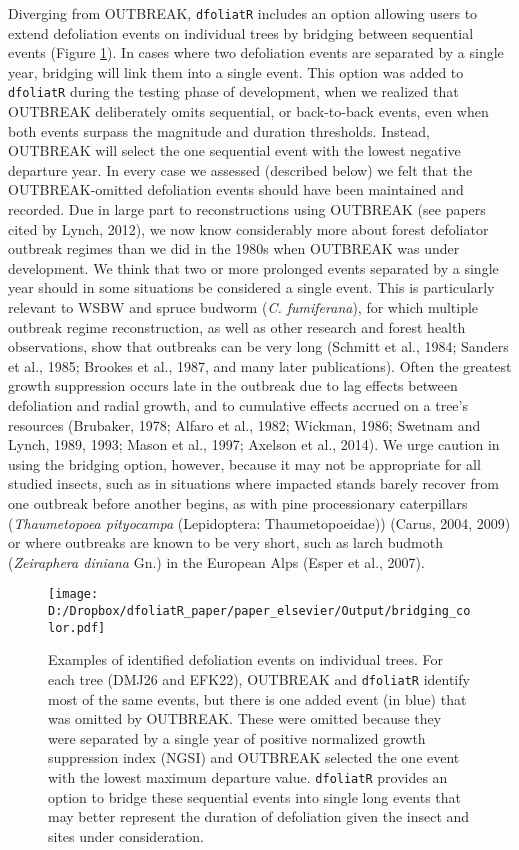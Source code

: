 \documentclass[review]{elsarticle} %
\makeatletter
\def\maxwidth{\ifdim\Gin@nat@width>\linewidth\linewidth
\else\Gin@nat@width\fi}
\let\Oldincludegraphics\includegraphics
\renewcommand{\includegraphics}[1]{\Oldincludegraphics[width=\maxwidth]{#1}}
\makeatother
\begin{document}
Diverging from OUTBREAK, \texttt{dfoliatR} includes an option allowing users to extend defoliation events on individual trees by bridging between sequential events (Figure \ref{fig:fig-bridge}). In cases where two defoliation events are separated by a single year, bridging will link them into a single event. This option was added to \texttt{dfoliatR} during the testing phase of development, when we realized that OUTBREAK deliberately omits sequential, or back-to-back events, even when both events surpass the magnitude and duration thresholds. Instead, OUTBREAK will select the one sequential event with the lowest negative departure year. In every case we assessed (described below) we felt that the OUTBREAK-omitted defoliation events should have been maintained and recorded. Due in large part to reconstructions using OUTBREAK (see papers cited by Lynch, 2012), we now know considerably more about forest defoliator outbreak regimes than we did in the 1980s when OUTBREAK was under development. We think that two or more prolonged events separated by a single year should in some situations be considered a single event. This is particularly relevant to WSBW and spruce budworm (\emph{C. fumiferana}), for which multiple outbreak regime reconstruction, as well as other research and forest health observations, show that outbreaks can be very long (Schmitt et al., 1984; Sanders et al., 1985; Brookes et al., 1987, and many later publications). Often the greatest growth suppression occurs late in the outbreak due to lag effects between defoliation and radial growth, and to cumulative effects accrued on a tree's resources (Brubaker, 1978; Alfaro et al., 1982; Wickman, 1986; Swetnam and Lynch, 1989, 1993; Mason et al., 1997; Axelson et al., 2014). We urge caution in using the bridging option, however, because it may not be appropriate for all studied insects, such as in situations where impacted stands barely recover from one outbreak before another begins, as with pine processionary caterpillars (\emph{Thaumetopoea pityocampa} (Lepidoptera: Thaumetopoeidae)) (Carus, 2004, 2009) or where outbreaks are known to be very short, such as larch budmoth (\emph{Zeiraphera diniana} Gn.) in the European Alps (Esper et al., 2007).



\begin{figure}
\centering
\texttt{[image: D:/Dropbox/dfoliatR\_paper/paper\_elsevier/Output/bridging\_color.pdf]}
\caption{\label{fig:fig-bridge}Examples of identified defoliation events on individual trees. For each tree (DMJ26 and EFK22), OUTBREAK and \texttt{dfoliatR} identify most of the same events, but there is one added event (in blue) that was omitted by OUTBREAK. These were omitted because they were separated by a single year of positive normalized growth suppression index (NGSI) and OUTBREAK selected the one event with the lowest maximum departure value. \texttt{dfoliatR} provides an option to bridge these sequential events into single long events that may better represent the duration of defoliation given the insect and sites under consideration.}
\end{figure}
\end{document}

